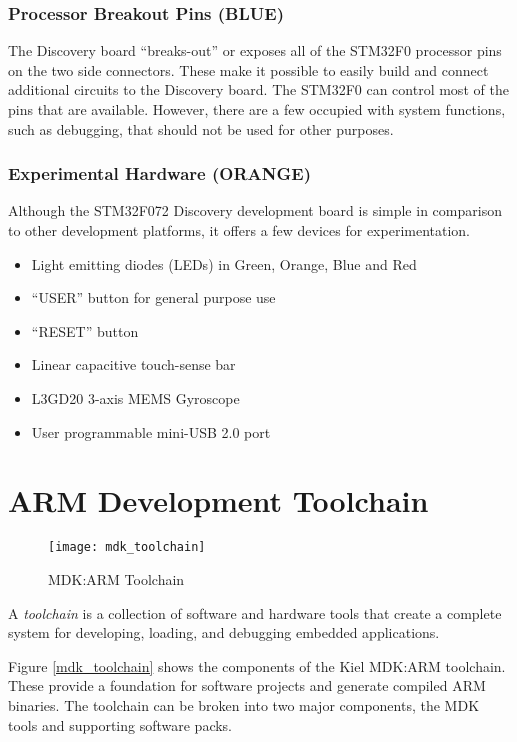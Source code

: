 \documentclass[11pt,fleqn]{book} %
\begin{document}
\subsubsection*{Processor Breakout Pins ({\color{blue!90!black}BLUE})}	

The Discovery board ``breaks-out'' or exposes all of the STM32F0 processor pins on the two side connectors. These make it possible to easily build and connect additional circuits to the Discovery board. The STM32F0 can control most of the pins that are available. However, there are a few occupied with system functions, such as debugging, that should not be used for other purposes. 
\newpage
\subsubsection*{Experimental Hardware  ({\color{orange!90!black}ORANGE})}
Although the STM32F072 Discovery development board is simple in comparison to other development platforms, it offers a few devices for experimentation.

\begin{itemize}
	\item Light emitting diodes (LEDs) in Green, Orange, Blue and Red
	\item ``USER'' button for general purpose use
	\item ``RESET'' button
	\item Linear capacitive touch-sense bar
	\item L3GD20 3-axis MEMS Gyroscope
	\item User programmable mini-USB 2.0 port
\end{itemize}
	

\section{ARM Development Toolchain}

\begin{figure}[b!]
	\centering\texttt{[image: mdk\_toolchain]}
	\caption{MDK:ARM Toolchain}
	\label{mdk_toolchain}
\end{figure}

A \textit{toolchain} is a collection of software and hardware tools that create a complete system for developing, loading, and debugging embedded applications. 

Figure \vref{mdk_toolchain} shows the components of the Kiel MDK:ARM toolchain. These provide a foundation for software projects and generate compiled ARM binaries. 
The toolchain can be broken into two major components, the MDK tools and supporting software packs.
\end{document}
